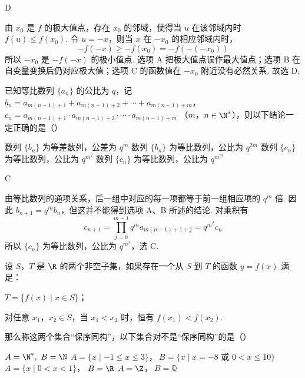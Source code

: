 \begin{answer}
D
\end{answer}

\begin{solution}
由 \(x_0\) 是 \(f\) 的极大值点，存在 \(x_0\) 的邻域，使得当 \(u\) 在该邻域内时 \(f(u)\leqslant f(x_0)\). 令 \(u=-x\)，则当 \(x\) 在 \(-x_0\) 的相应邻域内时，
\[
-f(-x)\geqslant-f(x_0)=-f(-(-x_0))
\]
所以 \(-x_0\) 是 \(-f(-x)\) 的极小值点. 选项 A 把极大值点误作最大值点；选项 B 在自变量变换后仍对应极大值；选项 C 的函数值在 \(-x_0\) 附近没有必然关系. 故选 D.
\end{solution}

\begin{problem}
已知等比数列 \(\{a_n\}\) 的公比为 \(q\)，记 \(b_n = a_{m(n-1)+1} + a_{m(n-1)+2} + \cdots + a_{m(n-1)+m}\)，\(c_n = a_{m(n-1)+1} \cdot a_{m(n-1)+2} \cdot \cdots \cdot a_{m(n-1)+m}\)
（\(m\)，\(n \in \N^{*}\)），则以下结论一定正确的是（\quad）

\choices
    {数列 \(\{b_n\}\) 为等差数列，公差为 \(q^{m}\)}
    {数列 \(\{b_n\}\) 为等比数列，公比为 \(q^{2m}\)}
    {数列 \(\{c_n\}\) 为等比数列，公比为 \(q^{m^{2}}\)}
    {数列 \(\{c_n\}\) 为等比数列，公比为 \(q^{m^{m}}\)}
\end{problem}

\begin{answer}
C
\end{answer}

\begin{solution}
由等比数列的通项关系，后一组中对应的每一项都等于前一组相应项的 \(q^m\) 倍. 因此 \(b_{n+1}=q^m b_n\)，但这并不能得到选项 A、B 所述的结论. 对乘积有
\[
c_{n+1}=\prod_{j=0}^{m-1}q^m a_{m(n-1)+1+j}=q^{m^2}c_n
\]
所以 \(\{c_n\}\) 为等比数列，公比为 \(q^{m^2}\)，选 C.
\end{solution}

\begin{problem}
设 \(S\)，\(T\) 是 \(\R\) 的两个非空子集，如果存在一个从 \(S\) 到 \(T\) 的函数 \(y = f(x)\) 满足：
\begin{circlelist}
\item \(T = \{f(x) \mid x \in S\}\)；
\item 对任意 \(x_1\)，\(x_2 \in S\)，当 \(x_1 < x_2\) 时，恒有 \(f(x_1) < f(x_2)\).
\end{circlelist}
那么称这两个集合“保序同构”，以下集合对不是“保序同构”的是（\quad）

\choices
    {\(A = \N^{*},\ B = \N\)}
    {\(A = \{x \mid -1 \leqslant x \leqslant 3\}\)，\(\ B = \{x \mid x = -8 \text{\ 或\ } 0 < x \leqslant 10\}\)}
    {\(A = \{x \mid 0 < x < 1\}\)，\(\ B = \R\)}
    {\(A = \Z\)，\(\ B = \mathbb{Q}\)}
\end{problem}

